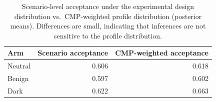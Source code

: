 \documentclass{eusset}
\begin{document}
\begin{table}[h]
  \centering
  \caption{Prespecified CI-motivated two-way interactions (posterior mean [95\% HDI]). P3$\times$D4 shows the strongest compounding disutility; R4$\times$C4 shows that Independent audit substantially mitigates broker-specific disutility. All estimates use hierarchical shrinkage priors.}
  \label{tab:interactions}
\end{table}
\begin{table}[h]
  \centering
  \begin{tabular}{l r r}
    \textbf{Arm} & \textbf{Scenario acceptance} & \textbf{CMP-weighted acceptance} \\
    \hline
    Neutral & 0.606 & 0.618 \\
    Benign  & 0.597 & 0.602 \\
    Dark    & 0.622 & 0.663 \\
  \end{tabular}
  \caption{Scenario-level acceptance under the experimental design distribution vs.\ CMP-weighted profile distribution (posterior means). Differences are small, indicating that inferences are not sensitive to the profile distribution.}
  \label{tab:profilesens_table}
\end{table}
\end{document}
